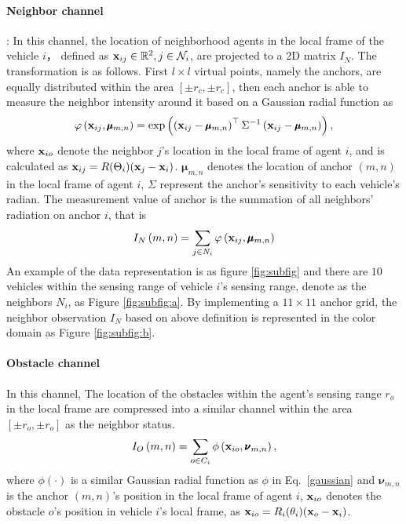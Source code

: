 \documentclass[letterpaper,10 pt,conference]{ieeeconf}
\begin{document}
\paragraph{Neighbor channel}: In this channel, the location of neighborhood agents in the local frame of the vehicle $i$， defined as $\mathbf{x}_{ij}\in \mathbb{R}^2, j\in \mathcal{N}_i$, are projected to a 2D matrix $I_N$. The transformation is as follows. First $ l\times l$ virtual points, namely the anchors, are equally distributed within the area $\left[\pm r_c, \pm r_c\right]$, then each anchor is able to measure the neighbor intensity around it based on a Gaussian radial function as 
\begin{equation}
\small	
\varphi\left(\mathbf{x}_{ij},\pmb\mu_{m,n}\right) = \exp \left(\left(\mathbf{x}_{ij}-\pmb \mu_{m,n}\right)^\top \Sigma^{-1}\left(\mathbf{x}_{ij}-\pmb \mu_{m,n}\right)\right),
\label{gaussian}
\end{equation}
where $\mathbf{x}_{io}$ denote the neighbor $j$'s location in the local frame of agent $i$, and is calculated as
$\mathbf{x}_{ij} = R(\Theta_i)(\mathbf{x}_j -\mathbf{x}_i)$.
$\pmb \mu_{m,n}$ denotes the location of anchor $(m,n)$ in the local frame of agent $i$, $\Sigma$ represent the anchor's sensitivity to each vehicle's radian.  The measurement value of anchor is the summation of all neighbors' radiation on anchor $i$, that is  
\begin{equation}
I_N\left(m,n\right) = \sum\limits_{j\in N_i}\varphi\left(\mathbf{x}_{ij},\pmb \mu_{m,n}\right)
\end{equation}
An example of the data representation is as figure \ref{fig:subfig} and there are $10$ vehicles within the sensing range of vehicle $i$'s sensing range, denote as the neighbors ${N}_i$, as Figure \ref{fig:subfig:a}. By implementing a $11\times 11$ anchor grid, the neighbor observation $I_N$ based on above definition is represented in the color domain as Figure \ref{fig:subfig:b}.

\paragraph{Obstacle channel} In  this channel, The location of the  obstacles within the agent's sensing range $r_o$ in the local frame are compressed into a similar channel within the area $\left[\pm r_o,\pm r_o\right]$ as the neighbor status.
\begin{equation}
I_O\left(m,n\right) = \sum\limits_{o\in C_i}\phi\left(\mathbf{x}_{io}, \pmb \nu_{m,n}\right),
\end{equation}
where $\phi\left(\cdot\right)$ is a similar Gaussian radial function as $\phi$ in Eq.~\ref{gaussian} and $\pmb \nu_{m,n}$ is the  anchor $\left(m,n\right)$'s position in the local frame of agent $i$, $\mathbf{x}_{io}$ denotes the obstacle $o$'s position in vehicle $i$'s local frame, as $\mathbf{x}_{io} = R_{i}(\theta_i)(\mathbf{x}_o -\mathbf{x}_i)$.
\end{document}
